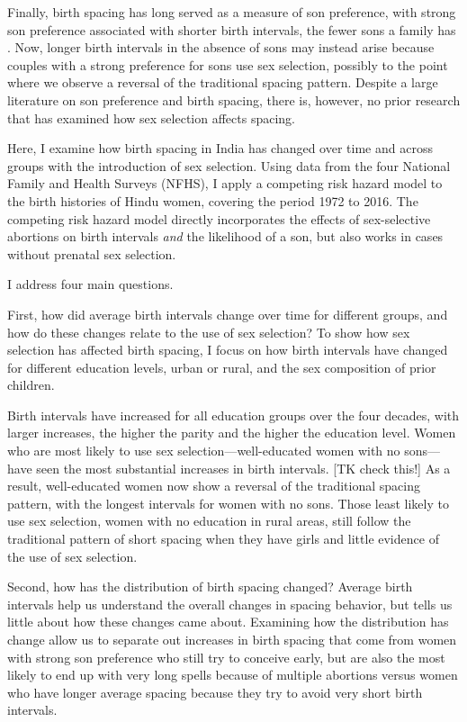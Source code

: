 \documentclass[12pt,letterpaper]{article}
\begin{document}
Finally, birth spacing has long served as a measure of son preference, with strong
son preference associated with shorter birth intervals, the fewer sons a family has 
\citep{ben-porath76b,Leung1988}.
Now, longer birth intervals in the absence of sons may instead arise because couples 
with a strong preference for sons use sex selection, possibly to the point where we 
observe a reversal of the traditional spacing pattern.
Despite a large literature on son preference and birth spacing, there is, however,
no prior research that has examined how sex selection affects spacing.

Here, I examine how birth spacing in India has changed over time and across 
groups with the introduction of sex selection.
Using data from the four National Family and Health Surveys (NFHS), I apply
a competing risk hazard model to the birth histories of Hindu women, covering
the period 1972 to 2016.
The competing risk hazard model directly incorporates the effects of 
sex-selective abortions on birth intervals
\emph{and} 
the likelihood of a son, 
but also works in cases without prenatal sex selection.
 

I address four main questions.

First, how did average birth intervals change over time for different groups, and how do 
these changes relate to the use of sex selection?
To show how sex selection has affected birth spacing, I focus on how birth intervals have
changed for different education levels, urban or rural, and the sex composition of 
prior children.

Birth intervals have increased for all education groups over the four decades, 
with larger increases, the higher the parity and the higher the education level.
Women who are most likely to use sex selection---well-educated women with no
sons---have seen the most substantial increases in birth intervals.
[TK check this!] As a result, well-educated women now show a reversal of the traditional spacing 
pattern, with the longest intervals for women with no sons.
Those least likely to use sex selection, women with no education in rural areas, 
still follow the traditional pattern of short spacing when they have girls and 
little evidence of the use of sex selection.

Second, how has the distribution of birth spacing changed?
Average birth intervals help us understand the overall changes in 
spacing behavior, but tells us little about how these changes came about.
Examining how the distribution has change allow us to separate out increases in birth
spacing that come from women with strong son preference who still try to conceive early, 
but are also the most likely to end up with very long spells because of multiple 
abortions versus women who have longer average spacing because they try to avoid very
short birth intervals.
\end{document}
